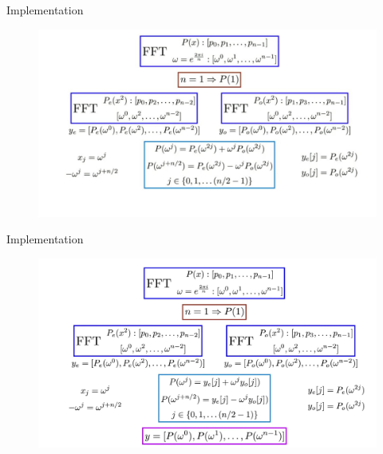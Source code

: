 \documentclass{beamer}
\begin{document}
\begin{frame}{Implementation}
       \centering
        \begin{figure}
           \centering
           \includegraphics[width=1\textwidth]{imp3.jpg}
           
           \label{fig:enter-label}
       \end{figure}
       
    \end{frame}
\begin{frame}{Implementation}
       \centering
        \begin{figure}
           \centering
           \includegraphics[width=1\textwidth]{imp4.jpg}
           
           \label{fig:enter-label}
       \end{figure}
       
    \end{frame}
	
\end{document}
